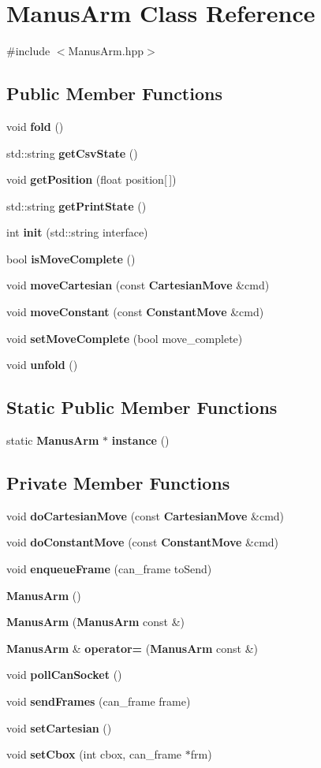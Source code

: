 \section{\-Manus\-Arm \-Class \-Reference}
\label{classManusArm}


{\ttfamily \#include $<$\-Manus\-Arm.\-hpp$>$}

\subsection*{\-Public \-Member \-Functions}
\begin{DoxyCompactItemize}
\item 
void {\bf fold} ()
\item 
std\-::string {\bf get\-Csv\-State} ()
\item 
void {\bf get\-Position} (float position[$\,$])
\item 
std\-::string {\bf get\-Print\-State} ()
\item 
int {\bf init} (std\-::string interface)
\item 
bool {\bf is\-Move\-Complete} ()
\item 
void {\bf move\-Cartesian} (const {\bf \-Cartesian\-Move} \&cmd)
\item 
void {\bf move\-Constant} (const {\bf \-Constant\-Move} \&cmd)
\item 
void {\bf set\-Move\-Complete} (bool move\-\_\-complete)
\item 
void {\bf unfold} ()
\end{DoxyCompactItemize}
\subsection*{\-Static \-Public \-Member \-Functions}
\begin{DoxyCompactItemize}
\item 
static {\bf \-Manus\-Arm} $\ast$ {\bf instance} ()
\end{DoxyCompactItemize}
\subsection*{\-Private \-Member \-Functions}
\begin{DoxyCompactItemize}
\item 
void {\bf do\-Cartesian\-Move} (const {\bf \-Cartesian\-Move} \&cmd)
\item 
void {\bf do\-Constant\-Move} (const {\bf \-Constant\-Move} \&cmd)
\item 
void {\bf enqueue\-Frame} (can\-\_\-frame to\-Send)
\item 
{\bf \-Manus\-Arm} ()
\item 
{\bf \-Manus\-Arm} ({\bf \-Manus\-Arm} const \&)
\item 
{\bf \-Manus\-Arm} \& {\bf operator=} ({\bf \-Manus\-Arm} const \&)
\item 
void {\bf poll\-Can\-Socket} ()
\item 
void {\bf send\-Frames} (can\-\_\-frame frame)
\item 
void {\bf set\-Cartesian} ()
\item 
void {\bf set\-Cbox} (int cbox, can\-\_\-frame $\ast$frm)
\end{DoxyCompactItemize}
